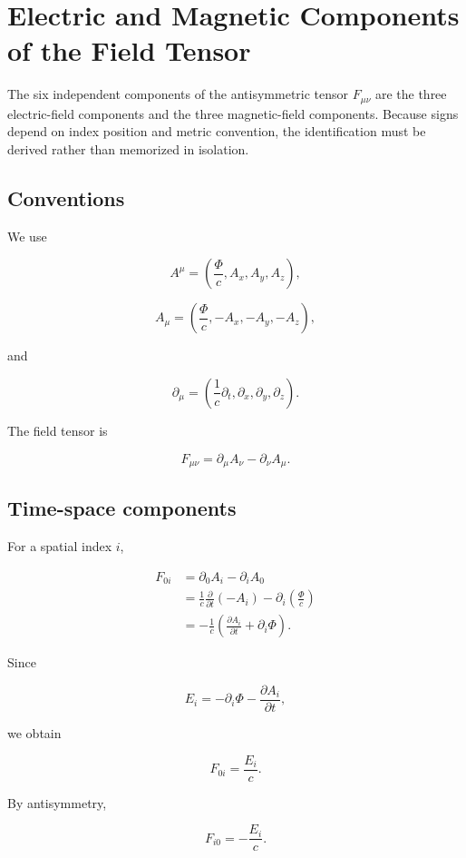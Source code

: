 \section{Electric and Magnetic Components of the Field Tensor}
\label{sec:electric_magnetic_tensor_components}

The six independent components of the antisymmetric tensor \(F_{\mu\nu}\) are the three electric-field components and the three magnetic-field components. Because signs depend on index position and metric convention, the identification must be derived rather than memorized in isolation.

\subsection{Conventions}

We use

\[
A^{\mu}
=
\left(
\frac{\Phi}{c},
A_x,
A_y,
A_z
\right),
\]

\[
A_{\mu}
=
\left(
\frac{\Phi}{c},
-A_x,
-A_y,
-A_z
\right),
\]

and

\[
\partial_{\mu}
=
\left(
\frac{1}{c}\partial_t,
\partial_x,
\partial_y,
\partial_z
\right).
\]

The field tensor is

\[
F_{\mu\nu}
=
\partial_{\mu}A_{\nu}
-
\partial_{\nu}A_{\mu}.
\]

\subsection{Time-space components}

For a spatial index \(i\),

\[
\begin{aligned}
F_{0i}
&=
\partial_0A_i
-
\partial_iA_0\\
&=
\frac{1}{c}
\frac{\partial}{\partial t}
(-A_i)
-
\partial_i
\left(
\frac{\Phi}{c}
\right)\\
&=
-
\frac{1}{c}
\left(
\frac{\partial A_i}{\partial t}
+
\partial_i\Phi
\right).
\end{aligned}
\]

Since

\[
E_i
=
-
\partial_i\Phi
-
\frac{\partial A_i}{\partial t},
\]

we obtain

\[
\boxed{
F_{0i}
=
\frac{E_i}{c}
}.
\]

By antisymmetry,

\[
\boxed{
F_{i0}
=
-
\frac{E_i}{c}
}.
\]

